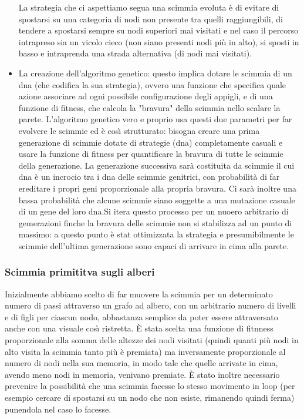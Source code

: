 \documentclass{article}
\begin{document}
\begin{itemize}
La strategia che ci aspettiamo segua una scimmia evoluta \`{e} di evitare di spostarsi su una categoria di nodi non presente tra quelli raggiungibili, di tendere a spostarsi sempre su nodi superiori mai visitati e nel caso il percorso intrapreso sia un vicolo cieco (non siano presenti nodi pi\`{u} in alto), si sposti in basso e intraprenda una strada alternativa (di nodi mai visitati).


 \item La creazione dell'algoritmo genetico: questo implica dotare le scimmia di un dna (che codifica la sua strategia), ovvero una funzione che specifica quale azione associare ad ogni possibile configurazione degli appigli, e di una funzione di fitness, che calcola la "bravura" della scimmia nello scalare la parete. L'algoritmo genetico vero e proprio usa questi due parametri per far evolvere le scimmie ed \`{e} cos\`{\i} strutturato: bisogna creare una prima generazione di scimmie dotate di strategie (dna) completamente casuali e usare la funzione di fitness per quantificare la bravura di tutte le scimmie della generazione. La generazione successiva sar\`{a} costituita da scimmie il cui dna \`{e} un incrocio tra i dna delle scimmie genitrici, con probabilit\`{a} di far ereditare i propri geni proporzionale alla propria bravura. Ci sar\`{a} inoltre una bassa probabilit\`{a} che alcune scimmie siano soggette a una mutazione casuale di un gene del loro dna.Si itera questo processo per un nuoero arbitrario di gemerazioni finche la bravura delle scimmie non si stabilizza ad un punto di massimo: a questo punto \`{e} stat ottimizzata la strategia e presumibilmente le scimmie dell'ultima generazione sono capaci di arrivare in cima alla parete.
\end{itemize}


\subsubsection{Scimmia primititva sugli alberi}
Inizialmente abbiamo scelto di far muovere la scimmia per un determinato numero di passi attraverso un grafo ad albero, con un arbitrario numero di livelli e di figli per ciascun nodo, abbastanza semplice da poter essere attraversato anche con una visuale cos\`{\i} ristretta. \`{E} stata scelta una funzione di fitnness proporzionale alla somma delle altezze dei nodi visitati (quindi quanti pi\`{u} nodi in alto visita la scimmia tanto pi\`{u} \`{e} premiata) ma inversamente proporzionale al numero di nodi nella sua memoria, in modo tale che quelle arrivate in cima, avendo meno nodi in memoria, venivano premiate. \`{E} stato inoltre necessario prevenire la possibilit\`{a} che una scimmia facesse lo stesso movimento in loop (per esempio cercare di spostarsi su un nodo che non esiste, rimanendo quindi ferma) punendola nel caso lo facesse.
\end{document}
